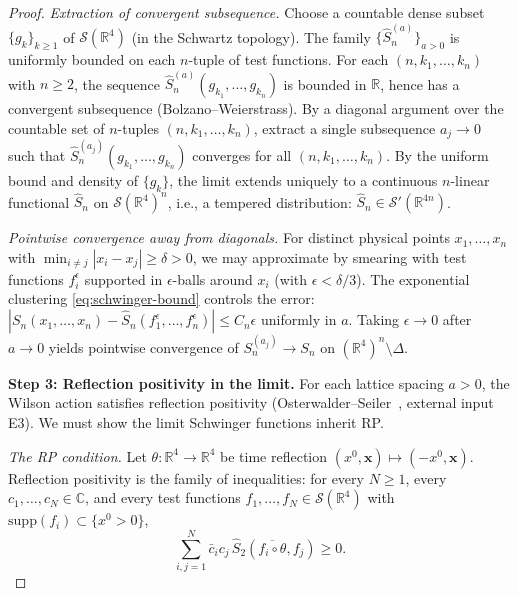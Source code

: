 \documentclass[11pt]{article}
\theoremstyle{definition}
\newcommand{\R}{\mathbb{R}}
\begin{document}
\begin{proof}
\emph{Extraction of convergent subsequence.}
Choose a countable dense subset $\{g_k\}_{k\ge 1}$
of $\mathcal{S}(\R^4)$ (in the Schwartz topology).
The family $\{\hat S_n^{(a)}\}_{a>0}$ is uniformly
bounded on each $n$-tuple of test functions.
For each $(n,k_1,\ldots,k_n)$ with $n\ge 2$, the
sequence $\hat S_n^{(a)}(g_{k_1},\ldots,g_{k_n})$
is bounded in $\R$, hence has a convergent
subsequence (Bolzano--Weierstrass).
By a diagonal argument over the countable set of
$n$-tuples $(n,k_1,\ldots,k_n)$, extract a single
subsequence $a_j\to 0$ such that
$\hat S_n^{(a_j)}(g_{k_1},\ldots,g_{k_n})$ converges
for all $(n,k_1,\ldots,k_n)$.
By the uniform bound and density of $\{g_k\}$, the
limit extends uniquely to a continuous $n$-linear
functional $\hat S_n$ on $\mathcal{S}(\R^4)^n$,
i.e., a tempered distribution:
$\hat S_n\in\mathcal{S}'(\R^{4n})$.

\emph{Pointwise convergence away from diagonals.}
For distinct physical points $x_1,\ldots,x_n$ with
$\min_{i\ne j}|x_i-x_j|\ge\delta>0$, we may
approximate by smearing with test functions $f_i^\epsilon$
supported in $\epsilon$-balls around $x_i$ (with
$\epsilon<\delta/3$).  The exponential clustering
\eqref{eq:schwinger-bound} controls the error:
$|S_n(x_1,\ldots,x_n)-\hat S_n(f_1^\epsilon,\ldots,
f_n^\epsilon)|\le C_n\epsilon$ uniformly in $a$.
Taking $\epsilon\to 0$ after $a\to 0$ yields pointwise
convergence of $S_n^{(a_j)}\to S_n$ on
$(\R^4)^n\setminus\Delta$.

\textbf{Step 3: Reflection positivity in the limit.}
For each lattice spacing $a>0$, the Wilson action
satisfies reflection positivity
(Osterwalder--Seiler~\cite{OS78}, external input E3).
We must show the limit Schwinger functions inherit RP.

\emph{The RP condition.}
Let $\theta:\R^4\to\R^4$ be time reflection
$(x^0,\mathbf{x})\mapsto(-x^0,\mathbf{x})$.
Reflection positivity is the family of inequalities:
for every $N\ge 1$, every $c_1,\ldots,c_N\in\mathbb{C}$,
and every test functions $f_1,\ldots,f_N\in
\mathcal{S}(\R^4)$ with $\mathrm{supp}(f_i)
\subset\{x^0>0\}$,
\begin{equation}\label{eq:RP-ineq}
\sum_{i,j=1}^N\bar c_i c_j\,
\hat S_2(\overline{f_i\circ\theta},f_j)\ge 0.
\end{equation}


\end{proof}
\end{document}
